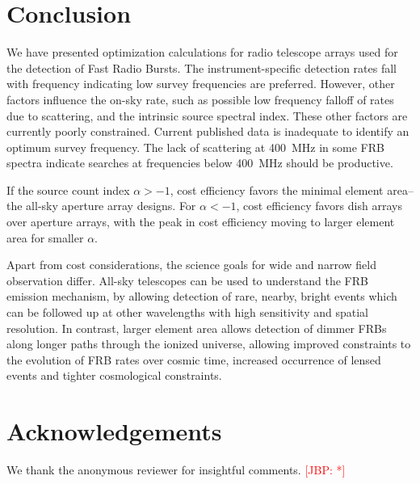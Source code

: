 \documentclass[fleqn,usenatbib]{mnras}
\newcommand{\kibitz}[2]{\ifnum\Comments=1\textcolor{#1}{#2}\fi}
\newcommand{\jbp}[1]{\kibitz{red}      {[JBP: #1]}}
\begin{document}
\section{Conclusion}

We have presented optimization calculations for radio telescope arrays used for the detection of Fast Radio Bursts.  The instrument-specific detection rates fall with frequency indicating low survey frequencies are preferred. However, other factors influence the on-sky rate, such as possible low frequency falloff of rates due to scattering, and the intrinsic source spectral index. These other factors are currently poorly constrained. Current published data is inadequate to identify an optimum survey frequency. The lack of scattering at 400~MHz in some FRB spectra indicate searches at frequencies below 400~MHz should be productive.

 
If the source count index $\alpha > -1$, cost efficiency favors the minimal element area--the all-sky aperture array designs.  For $\alpha < -1$, cost efficiency favors dish arrays over aperture arrays, with the peak in cost efficiency moving to larger element area for smaller $\alpha$. 

Apart from cost considerations, the science goals for wide and narrow field observation differ.
All-sky telescopes can be used to understand the FRB emission mechanism, by allowing detection of rare, nearby, bright events which can be followed up at other wavelengths with high sensitivity and spatial resolution. In contrast, larger element area allows detection of dimmer FRBs along longer paths through the ionized universe, allowing improved constraints to the evolution of FRB rates over cosmic time, increased occurrence of lensed events and tighter cosmological constraints.

\section*{Acknowledgements}
We thank the anonymous reviewer for insightful comments. \jbp{*}




 



\label{lastpage}
\end{document}
